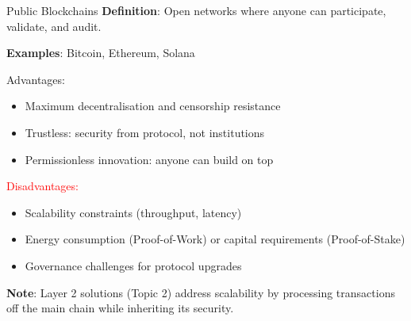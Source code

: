 \documentclass[10pt]{beamer}
\newcommand{\good}[1]{\textcolor{AccentGreen}{#1}}
\newcommand{\bad}[1]{\textcolor{red}{#1}}
\begin{document}
\begin{frame}{Public Blockchains}
  \textbf{Definition}: Open networks where anyone can participate, validate, and audit.
  
  \vspace{0.5em}
  \textbf{Examples}: Bitcoin, Ethereum, Solana
  
  \vspace{1em}
  \good{Advantages:}
  \begin{itemize}
    \item Maximum decentralisation and censorship resistance
    \item Trustless: security from protocol, not institutions
    \item Permissionless innovation: anyone can build on top
  \end{itemize}
  
  \vspace{0.5em}
  \bad{Disadvantages:}
  \begin{itemize}
    \item Scalability constraints (throughput, latency)
    \item Energy consumption (Proof-of-Work) or capital requirements (Proof-of-Stake)
    \item Governance challenges for protocol upgrades
  \end{itemize}
  
  \vspace{0.5em}
  \textbf{Note}: Layer 2 solutions (Topic 2) address scalability by processing transactions off the main chain while inheriting its security.
\end{frame}
\end{document}
